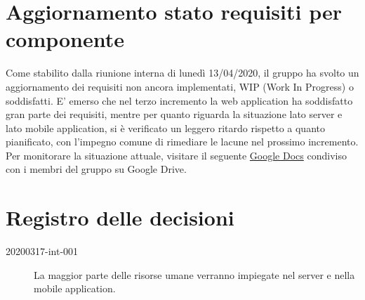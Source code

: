 \documentclass{article}
\begin{document}
\section{Aggiornamento stato requisiti per componente}%
\label{sec:aggiornamento_stato_requisiti_per_componente}

Come stabilito dalla riunione interna di lunedì 13/04/2020, il gruppo ha svolto un aggiornamento dei requisiti non ancora implementati, WIP (Work In Progress) o soddisfatti.
E' emerso che nel terzo incremento la web application ha soddisfatto gran parte dei requisiti, mentre per quanto riguarda la situazione lato server e lato mobile application, si è verificato un leggero ritardo rispetto a quanto pianificato, con l'impegno comune di rimediare le lacune nel prossimo incremento.
Per monitorare la situazione attuale, visitare il seguente \href{https://docs.google.com/spreadsheets/d/1J-RbNrb1yN_X1rVlKzpP9rjaiGst8B62k1K6EHY-grU/edit#gid=0}{Google Docs} condiviso con i membri del gruppo su Google Drive.

\newpage
\section{Registro delle decisioni}%
\label{sec:registro_delle_decisioni}

\begin{description}
  \item[20200317-int-001] La maggior parte delle risorse umane verranno impiegate nel server e nella mobile application.
\end{description}


\end{document}

